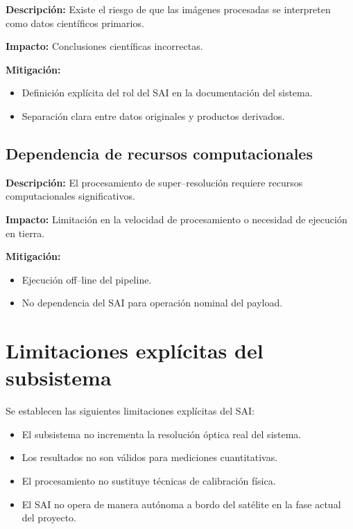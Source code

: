 \textbf{Descripción:}  
Existe el riesgo de que las imágenes procesadas se interpreten como datos
científicos primarios.

\textbf{Impacto:}  
Conclusiones científicas incorrectas.

\textbf{Mitigación:}
\begin{itemize}
    \item Definición explícita del rol del SAI en la documentación del sistema.
    \item Separación clara entre datos originales y productos derivados.
\end{itemize}

\subsection{Dependencia de recursos computacionales}

\textbf{Descripción:}  
El procesamiento de super--resolución requiere recursos computacionales
significativos.

\textbf{Impacto:}  
Limitación en la velocidad de procesamiento o necesidad de ejecución en tierra.

\textbf{Mitigación:}
\begin{itemize}
    \item Ejecución off--line del pipeline.
    \item No dependencia del SAI para operación nominal del payload.
\end{itemize}

\section{Limitaciones explícitas del subsistema}

Se establecen las siguientes limitaciones explícitas del SAI:

\begin{itemize}
    \item El subsistema no incrementa la resolución óptica real del sistema.
    \item Los resultados no son válidos para mediciones cuantitativas.
    \item El procesamiento no sustituye técnicas de calibración física.
    \item El SAI no opera de manera autónoma a bordo del satélite en la fase
    actual del proyecto.
\end{itemize}

